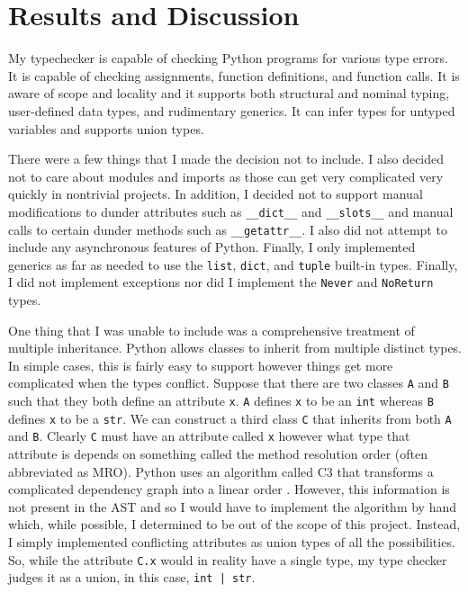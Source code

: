 \documentclass[10pt,twocolumn]{article}
\begin{document}
\section{Results and Discussion}

My typechecker is capable of checking Python programs for various type errors. It is capable of checking assignments, function definitions, and function calls. It is aware of scope and locality and it supports both structural and nominal typing, user-defined data types, and rudimentary generics. It can infer types for untyped variables and supports union types.

There were a few things that I made the decision not to include. I also decided not to care about modules and imports as those can get very complicated very quickly in nontrivial projects. In addition, I decided not to support manual modifications to dunder attributes such as \verb|__dict__| and \verb|__slots__| and manual calls to certain dunder methods such as \verb|__getattr__|. I also did not attempt to include any asynchronous features of Python. Finally, I only implemented generics as far as needed to use the \verb|list|, \verb|dict|, and \verb|tuple| built-in types. Finally, I did not implement exceptions nor did I implement the \verb|Never| and \verb|NoReturn| types.

One thing that I was unable to include was a comprehensive treatment of multiple inheritance. Python allows classes to inherit from multiple distinct types. In simple cases, this is fairly easy to support however things get more complicated when the types conflict. Suppose that there are two classes \verb|A| and \verb|B| such that they both define an attribute \verb|x|. \verb|A| defines \verb|x| to be an \verb|int| whereas \verb|B| defines \verb|x| to be a \verb|str|. We can construct a third class \verb|C| that inherits from both \verb|A| and \verb|B|. Clearly \verb|C| must have an attribute called \verb|x| however what type that attribute is depends on something called the method resolution order (often abbreviated as MRO). Python uses an algorithm called C3 that transforms a complicated dependency graph into a linear order \cite{pythonmro}. However, this information is not present in the AST and so I would have to implement the algorithm by hand which, while possible, I determined to be out of the scope of this project. Instead, I simply implemented conflicting attributes as union types of all the possibilities. So, while the attribute \verb|C.x| would in reality have a single type, my type checker judges it as a union, in this case, \verb+int | str+.
\end{document}
